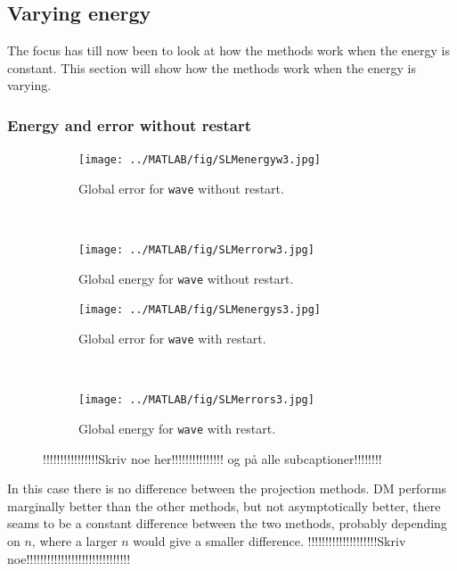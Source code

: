 \subsection{Varying energy}
The focus has till now been to look at how the methods work when the energy is constant. This section will show how the methods work when the energy is varying. 

\subsubsection{Energy and error without restart}%

\begin{figure}[H]
        \centering
        \begin{subfigure}[b]{0.45\textwidth}
                \texttt{[image: ../MATLAB/fig/SLMenergyw3.jpg]}
                \caption{Global error for \texttt{wave} without restart.}
                \label{fig:SLMenergyw1}
        \end{subfigure}
        ~
        \begin{subfigure}[b]{0.45\textwidth}
                \texttt{[image: ../MATLAB/fig/SLMerrorw3.jpg]}
                \caption{Global energy for \texttt{wave} without restart.}
                \label{fig:SLMerrorw1}
        \end{subfigure}
        
        \begin{subfigure}[b]{0.45\textwidth}
                \texttt{[image: ../MATLAB/fig/SLMenergys3.jpg]}
                \caption{Global error for \texttt{wave} with restart.}
                \label{fig:SLMenergys1}
        \end{subfigure}
		~
        \begin{subfigure}[b]{0.45\textwidth}
                \texttt{[image: ../MATLAB/fig/SLMerrors3.jpg]}
                \caption{Global energy for \texttt{wave} with restart.}
                \label{fig:SLMerrors1}
        \end{subfigure}
        \caption{!!!!!!!!!!!!!!!!Skriv noe her!!!!!!!!!!!!!!! og på alle subcaptioner!!!!!!!!}
        \label{fig:SLMenergyerror1}
\end{figure}
In this case there is no difference between the projection methods. DM performs marginally better than the other methods, but not asymptotically better, there seams to be a constant difference between the two methods, probably depending on $n$, where a larger $n$ would give a smaller difference.
!!!!!!!!!!!!!!!!!!!!Skriv noe!!!!!!!!!!!!!!!!!!!!!!!!!!!!!!\\
